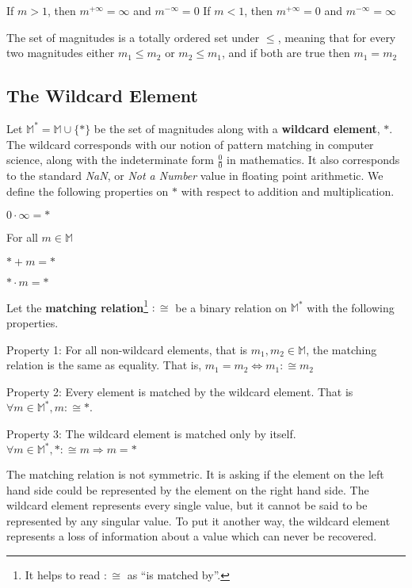 \documentclass[twoside]{article}
\newcommand{\quotes}[1]{``#1''}
\begin{document}
If \(m > 1\), then \(m^{+\infty} = \infty\) and \(m^{-\infty} = 0\)
If \(m < 1\), then \(m^{+\infty} = 0\) and \(m^{-\infty} = \infty\)

The set of magnitudes is a totally ordered set under \(\leq\), meaning that for every two magnitudes either \(m_1 \leq m_2\) or \(m_2 \leq m_1\), and if both are true then \(m_1 = m_2\)

\subsection{The Wildcard Element}

Let \(\mathbb{M}^* = \mathbb{M} \cup \{\ast\}\) be the set of magnitudes along with a \textbf{wildcard element}, \(\ast\). The wildcard corresponds with our notion of pattern matching in computer science, along with the indeterminate form \(\frac{0}{0}\) in mathematics. It also corresponds to the standard \textit{NaN}, or \textit{Not a Number} value in floating point arithmetic. We define the following properties on \(\ast\) with respect to addition and multiplication.

\(0 \cdot \infty = \ast\)

For all \(m \in \mathbb{M}\)

\(\ast + m = \ast\)

\(\ast \cdot m = \ast\)

Let the \textbf{matching relation}\footnote{It helps to read \(:\cong\) as \quotes{is matched by}.} \(:\cong\) be a binary relation on \(\mathbb{M}^*\) with the following properties.

Property 1: For all non-wildcard elements, that is \(m_1, m_2 \in \mathbb{M}\), the matching relation is the same as equality. That is, \(m_1 = m_2  \Leftrightarrow m_1 :\cong m_2 \)

Property 2: Every element is matched by the wildcard element. That is \(\forall m \in \mathbb{M}^*, m :\cong \ast\).

Property 3: The wildcard element is matched only by itself. \(\forall m \in \mathbb{M}^*, \ast :\cong m \Rightarrow m = \ast\)

The matching relation is not symmetric. It is asking if the element on the left hand side could be represented by the element on the right hand side. The wildcard element represents every single value, but it cannot be said to be represented by any singular value. To put it another way, the wildcard element represents a loss of information about a value which can never be recovered.
\end{document}
